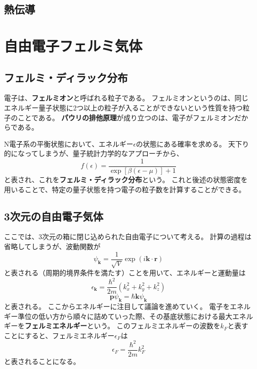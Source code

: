 \documentclass[a4paper]{jsreport}
\begin{document}
        \section{熱伝導}
        
    \chapter{自由電子フェルミ気体}
        \section{フェルミ・ディラック分布}
            電子は、\textbf{フェルミオン}と呼ばれる粒子である。
            フェルミオンというのは、同じエネルギー量子状態に2つ以上の粒子が入ることができないという性質を持つ粒子のことである。
            \textbf{パウリの排他原理}が成り立つのは、電子がフェルミオンだからである。\par
             N電子系の平衡状態において、エネルギー$\epsilon$の状態にある確率を求める。
             天下り的になってしまうが、量子統計力学的なアプローチから、
             \begin{equation}
                f(\epsilon) = \frac{1}{\exp[\beta(\epsilon - \mu)] + 1}
             \end{equation}
             と表され、これを\textbf{フェルミ・ディラック分布}という。
             これと後述の状態密度を用いることで、特定の量子状態を持つ電子の粒子数を計算することができる。

        \section{3次元の自由電子気体}
             ここでは、3次元の箱に閉じ込められた自由電子について考える。
             計算の過程は省略してしまうが、波動関数が
             \begin{equation}
                \psi_{\boldsymbol{k}} = \frac{1}{\sqrt{V}} \exp(i\boldsymbol{k} \cdot \boldsymbol{r})
             \end{equation}
             と表される（周期的境界条件を満たす）ことを用いて、エネルギーと運動量は
             \begin{equation}
                \epsilon_{\boldsymbol{k}} = \frac{\hbar^2}{2m} \left(k_x^2 + k_y^2 + k_z^2 \right)
             \end{equation}
             \begin{equation}
                \boldsymbol{p}\psi_{\boldsymbol{k}} = \hbar \boldsymbol{k}\psi_{\boldsymbol{k}}
             \end{equation}
             と表される。
             ここからエネルギーに注目して議論を進めていく。
             電子をエネルギー準位の低い方から順々に詰めていった際、その基底状態における最大エネルギーを\textbf{フェルミエネルギー}という。
             このフェルミエネルギーの波数を$k_F$と表すことにすると、フェルミエネルギー$\epsilon_F$は
             \begin{equation}
                \epsilon_F = \frac{\hbar^2}{2m} k_F^2
             \end{equation}
             と表されることになる。
\end{document}
